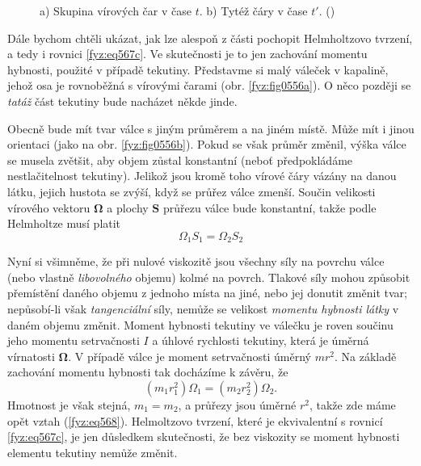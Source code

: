     \begin{figure}[ht!]
      \centering
      \caption{a) Skupina vírových čar v čase \(t\). b) Tytéž čáry v čase \(t'\).
               (\cite[s.~755]{Feynman02})}
    \end{figure}

    Dále bychom chtěli ukázat, jak lze alespoň z části pochopit Helmholtzovo tvrzení, a tedy i 
    rovnici \ref{fyz:eq567c}. Ve skutečnosti je to jen zachování momentu hybnosti, použité v 
    případě tekutiny. Představme si malý váleček v kapalině, jehož osa je rovnoběžná s vírovými 
    čarami (obr. \ref{fyz:fig0556a}). O něco později se \emph{tatáž} část tekutiny bude nacházet 
    někde jinde. 
    
    Obecně bude mít tvar válce s jiným průměrem a na jiném místě. Může mít i jinou orientaci (jako 
    na obr. \ref{fyz:fig0556b}). Pokud se však průměr změnil, výška válce se musela 
    zvětšit, aby objem zůstal konstantní (neboť předpokládáme nestlačitelnost tekutiny). Jelikož 
    jsou kromě toho vírové čáry vázány na danou látku, jejich hustota se zvýší, když se průřez 
    válce zmenší. Součin velikosti vírového vektoru \(\symbf{\Omega}\) a plochy \(\bm{S}\) průřezu 
    válce bude konstantní, takže podle Helmholtze musí platit
    \begin{equation}\label{fyz:eq568}
      \Omega_1S_1 = \Omega_2S_2
    \end{equation}
    
    Nyní si všimněme, že při nulové viskozitě jsou všechny síly na povrchu válce (nebo vlastně 
    \emph{libovolného} objemu) kolmé na povrch. Tlakové síly mohou způsobit přemístění daného 
    objemu z jednoho místa na jiné, nebo jej donutit změnit tvar; nepůsobí-li však 
    \emph{tangenciální} síly, nemůže se velikost \emph{momentu hybnosti látky} v daném objemu 
    změnit. Moment hybnosti tekutiny ve válečku je roven součinu jeho momentu setrvačnosti \(I\) a 
    úhlové rychlosti tekutiny, která je úměrná vírnatosti \(\symbf{\Omega}\). V případě válce je 
    moment setrvačnosti úměrný \(mr^2\). Na základě zachování momentu hybnosti tak docházíme k 
    závěru, že
    \begin{equation*}
      (m_1r_1^2)\Omega_1 = (m_2r_2^2)\Omega_2.
    \end{equation*}
    Hmotnost je však stejná, \(m_1 = m_2\), a průřezy jsou úměrné \(r^2\), takže zde máme opět 
    vztah (\ref{fyz:eq568}). Helmoltzovo tvrzení, které je ekvivalentní s rovnicí \ref{fyz:eq567c}, 
    je jen důsledkem skutečnosti, že bez viskozity se moment hybnosti elementu tekutiny nemůže 
    změnit.
    
